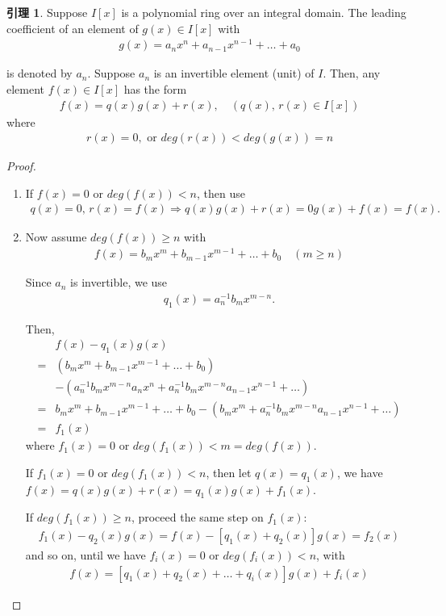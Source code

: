 \documentclass[utf8]{ctexbook}
\theoremstyle{definition}
\newtheorem{lemma}{引理}[section]
\begin{document}
\begin{lemma}\label{lemma_ID_polynomial_ring}
Suppose $I[x]$ is a polynomial ring over an integral domain. The leading coefficient of an element of $g(x) \in I[x]$ with
\begin{align*}
g(x)= a_n x^n + a_{n-1} x^{n-1} + \ldots + a_0
\end{align*}

is denoted by $a_n$. Suppose $a_n$ is an invertible element (unit) of $I$. Then, any element $f(x) \in I[x]$ has the form
\begin{align*}
f(x) = q(x) g(x) + r(x), \quad (q(x), \, r(x) \in I[x]) 
\end{align*}
where 
\begin{align*}
r(x) = 0, \mbox{ or } deg(r(x)) < deg(g(x)) = n
\end{align*}
\end{lemma}

\begin{proof}
\begin{enumerate}
\item{If $f(x)=0$ or $deg(f(x)) < n$, then use
\begin{align*}
q(x) = 0, \, r(x) = f(x) \Longrightarrow q(x) g(x) + r(x) = 0 g(x) + f(x) = f(x) .
\end{align*}
}
\item{Now assume $deg(f(x)) \geq n $ with
\begin{align*}
f(x) = b_m x^m + b_{m-1} x^{m-1} + \ldots + b_0  \quad (m \geq n)
\end{align*}

Since $a_n$ is invertible, we use
\begin{align*}
q_1 (x) = a_n ^{-1} b_m x^{m-n} .
\end{align*}

Then,
\begin{align*}
& f(x) - q_1(x) g(x) \\
=&  (b_m x^m + b_{m-1} x^{m-1} + \ldots + b_0) \\
& - (a_n ^{-1} b_m x^{m-n} a_n x^{n} + a_n ^{-1} b_m x^{m-n} a_{n-1} x^{n-1} + \ldots  ) \\
=& b_m x^m + b_{m-1} x^{m-1} + \ldots + b_0 - (b_m x^{m} + a_n ^{-1} b_m x^{m-n} a_{n-1} x^{n-1} + \ldots  ) \\
=& f_1 (x)
\end{align*}
where $f_1 (x) = 0$ or $deg(f_1(x)) < m = deg(f(x)) $. 

If $f_1 (x) = 0$ or $deg(f_1(x)) < n$, then let $q(x) = q_1 (x)$, we have $f(x) = q(x) g(x) + r(x) = q_1(x) g(x) + f_1 (x) $.

If $deg(f_1(x)) \geq n$, proceed the same step on $f_1 (x)$:
\begin{align*}
f_1 (x) - q_2 (x) g(x) = f(x) - [q_1 (x) + q_2 (x)] g(x) = f_2 (x)
\end{align*}
and so on, until we have $f_i(x) = 0$ or $deg(f_i (x)) < n$, with 
\begin{align*}
f(x) = [q_1 (x) + q_2(x) + \ldots + q_i (x) ] g(x) + f_i (x)
\end{align*}
}
\end{enumerate}
\end{proof}
\end{document}
